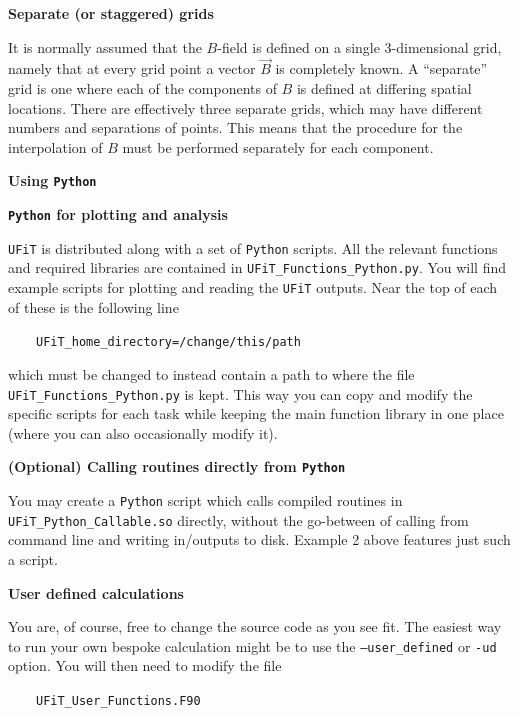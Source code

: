 \documentclass[12pt,twoside]{article}
\begin{document}
{\large \textbf{Separate (or staggered) grids}}

It is normally assumed that the $B$-field is defined on a single 3-dimensional grid, namely that at every grid point a vector $\vec{B}$ is completely known. A ``separate'' grid is one where each of the components of $B$ is defined at differing spatial locations. There are effectively three separate grids, which may have different numbers and separations of points. This means that the procedure for the interpolation of $B$ must be performed separately for each component.


\vspace{4mm}
{\Large \textbf{Using \texttt{Python}}}

\vspace{2mm}
{\large \textbf{\texttt{Python} for plotting and analysis}}

\texttt{UFiT} is distributed along with a set of \texttt{Python} scripts. All the relevant functions and required libraries are contained in \texttt{UFiT\_Functions\_Python.py}. You will find example scripts for plotting and reading the \texttt{UFiT} outputs. Near the top of each of these is the following line

$\quad\quad$\texttt{UFiT\_home\_directory=\textquotesingle /change/this/path\textquotesingle }

which must be changed to instead contain a path to where the file \texttt{UFiT\_Functions\_Python.py} is kept. This way you can copy and modify the specific scripts for each task while keeping the main function library in one place (where you can also occasionally modify it).


\vspace{2mm}
{\large \textbf{(Optional) Calling routines directly from \texttt{Python}}}

You may create a \texttt{Python} script which calls compiled routines in \texttt{UFiT\_Python\_Callable.so} directly, without the go-between of calling from command line and writing in/outputs to disk. Example 2 above features just such a script.


\vspace{3mm}
{\Large \textbf{User defined calculations}}

You are, of course, free to change the source code as you see fit. The easiest way to run your own bespoke calculation might be to use the \texttt{--user\_defined} or \texttt{-ud} option. You will then need to modify the file 

$\quad\quad$\texttt{UFiT\_User\_Functions.F90}
\end{document}
